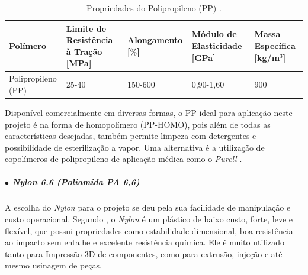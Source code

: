 \begin{table}[ht] 

    \centering 

    \caption{Propriedades do Polipropileno (PP) \cite{materiais}.} 

    \label{tab:PropPP} 

    \begin{adjustbox}{max width = \textwidth} 

        \begin{tabular}{|C{3cm}|C{3cm}|C{2.8cm}|C{3cm}|C{2.5cm}|} 

            \hline 


            \textbf{Polímero} & \textbf{Limite de Resistência à Tração [MPa]} & \textbf{Alongamento [$\%$]} & \textbf{Módulo  de Elasticidade [GPa]} & \textbf{Massa Específica [kg/m$^3$]} \\ \hline 

             

              Polipropileno (PP) & 25-40 & 150-600 & 0,90-1,60  & 900 

             \\ \hline 

        \end{tabular} 

    \end{adjustbox} 

\end{table} 
Disponível comercialmente em diversas formas, o PP ideal para aplicação neste projeto é na forma de homopolímero (PP-HOMO), pois além de todas as características desejadas, também permite limpeza com detergentes e possibilidade de esterilização a vapor. Uma alternativa é a utilização de copolímeros de polipropileno de aplicação médica como o \textit{Purell} \cite{HMC_poly}.

\subparagraph*{$\bullet$ Nylon 6.6 (Poliamida PA 6,6)} \hfill

A escolha do \textit{Nylon} para o projeto se deu pela sua facilidade de manipulação e custo operacional. Segundo \cite{Imp3D_Polimeros}, o \textit{Nylon} é um plástico de baixo custo, forte, leve e flexível, que possui propriedades como estabilidade dimensional, boa resistência ao impacto sem entalhe e excelente resistência química. Ele é muito utilizado tanto para Impressão 3D de componentes, como para extrusão, injeção e até mesmo usinagem de peças.

